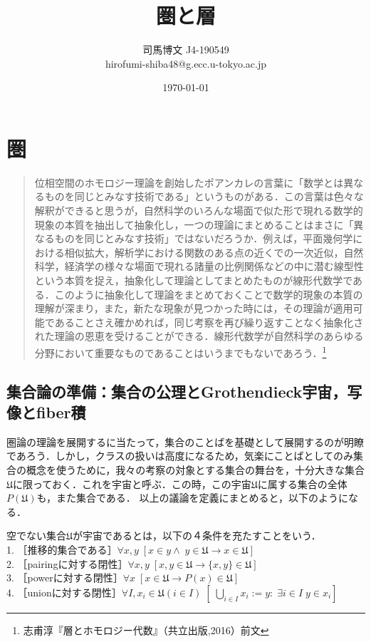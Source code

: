 \documentclass[uplatex, 12pt, dvipdfmx]{jsreport}
\title{圏と層}
\author{司馬博文 J4-190549\\hirofumi-shiba48@g.ecc.u-tokyo.ac.jp}
\date{\today}
\begin{document}
\maketitle
\tableofcontents
\clearpage

\part{圏}

\begin{quotation}
    位相空間のホモロジー理論を創始したポアンカレの言葉に「数学とは異なるものを同じとみなす技術である」というものがある．この言葉は色々な解釈ができると思うが，自然科学のいろんな場面で似た形で現れる数学的現象の本質を抽出して抽象化し，一つの理論にまとめることはまさに「異なるものを同じとみなす技術」ではないだろうか．例えば，平面幾何学における相似拡大，解析学における関数のある点の近くでの一次近似，自然科学，経済学の様々な場面で現れる諸量の比例関係などの中に潜む線型性という本質を捉え，抽象化して理論としてまとめたものが線形代数学である．このように抽象化して理論をまとめておくことで数学的現象の本質の理解が深まり，また，新たな現象が見つかった時には，その理論が適用可能であることさえ確かめれば，同じ考察を再び繰り返すことなく抽象化された理論の恩恵を受けることができる．線形代数学が自然科学のあらゆる分野において重要なものであることはいうまでもないであろう．\footnote{志甫淳『層とホモロジー代数』（共立出版,2016）前文}
\end{quotation}

\chapter{集合論の準備：集合の公理とGrothendieck宇宙，写像とfiber積}
圏論の理論を展開するに当たって，集合のことばを基礎として展開するのが明瞭であろう．しかし，クラスの扱いは高度になるため，気楽にことばとしてのみ集合の概念を使うために，我々の考察の対象とする集合の舞台を，十分大きな集合$\mathfrak{U}$に限っておく．これを宇宙と呼ぶ．この時，この宇宙$\mathfrak{U}$に属する集合の全体$P(\mathfrak{U})$も，また集合である．
以上の議論を定義にまとめると，以下のようになる．

\begin{shadebox}\begin{definition}[Grothendieck宇宙]\rm{}\label{grothendieck}
    空でない集合$\mathfrak{U}$が宇宙であるとは，以下の４条件を充たすことをいう．\\
    1. ［推移的集合である］$\forall x,y \; [x\in y \wedge \; y\in \mathfrak{U} \rightarrow x\in \mathfrak{U}]$\\
    2. ［pairingに対する閉性］$\forall x,y \; [x,y\in \mathfrak{U} \rightarrow \{ x,y\} \in \mathfrak{U}]$\\
    3. ［powerに対する閉性］$\forall x \; [x\in\mathfrak{U} \rightarrow P(x) \in \mathfrak{U}]$\\
    4. ［unionに対する閉性］$\forall I,x_i \in \mathfrak{U}(i\in I) \; [\; \bigcup_{i\in I} x_i := {y:\; \exists i\in I \; y\in x_i}]$
\end{definition}\end{shadebox}
\end{document}
